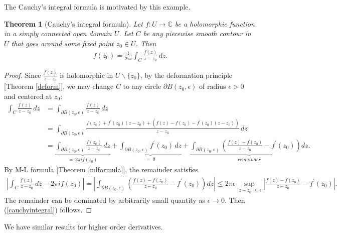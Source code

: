 \documentclass{article}
\numberwithin{equation}{section}
\newcommand{\bbC}{\mathbb{C}}
\theoremstyle{plain}
\newtheorem{theorem}{Theorem}[section]
\theoremstyle{definition}
\begin{document}
The Cauchy's integral formula is motivated by this example.
\begin{theorem}[Cauchy's integral formula]\label{cauchyintformula}
Let $f:U\to\bbC$ be a holomorphic function in a simply connected open domain $U$. Let $C$ be any piecewise smooth contour in $U$ that goes around some fixed point $z_0\in U$. Then
\begin{align}
	f(z_0)=\frac{1}{2\pi i}\int_C\frac{f(z)}{z-z_0}\,dz.\label{cauchyintegral}
\end{align}
\end{theorem}
\begin{proof}
Since $\frac{f(z)}{z-z_0}$ is holomorphic in $U\backslash\{z_0\}$, by the deformation principle [Theorem \ref{deform}], we may change $C$ to any circle $\partial B(z_0,\epsilon)$ of radius $\epsilon>0$ and centered at $z_0$:
\begin{align*}
	\int_C\frac{f(z)}{z-z_0}\,dz&=\int_{\partial B(z_0,\epsilon)}\frac{f(z)}{z-z_0}\,dz\\
	&=\int_{\partial B(z_0,\epsilon)}\frac{f(z_0)+f^\prime(z_0)(z-z_0)+\left(f(z)-f(z_0)-f^\prime(z_0)(z-z_0)\right)}{z-z_0}\,dz\\
	&=\underbrace{\int_{\partial B(z_0,\epsilon)}\frac{f(z_0)}{z-z_0}\,dz}_{=\,2\pi i f(z_0)}+\underbrace{\int_{\partial B(z_0,\epsilon)}f^\prime(z_0)\,dz}_{=\,0}+\underbrace{\int_{\partial B(z_0,\epsilon)}\left(\frac{f(z)-f(z_0)}{z-z_0}-f^\prime(z_0)\right)dz}_{remainder}.
\end{align*}
By M-L formula [Theorem \ref{mlformula}], the remainder satisfies
\begin{align*}
	\left\vert\int_C\frac{f(z)}{z-z_0}\,dz-2\pi i f(z_0)\right\vert=\left\vert\int_{\partial B(z_0,\epsilon)}\left(\frac{f(z)-f(z_0)}{z-z_0}-f^\prime(z_0)\right)dz\right\vert\leq2\pi\epsilon\sup_{\vert z-z_0\vert\leq\epsilon}\left\vert \frac{f(z)-f(z_0)}{z-z_0}-f^\prime(z_0)\right\vert.
\end{align*}
The remainder can be dominated by arbitrarily small quantity as $\epsilon\to 0$. Then (\ref{cauchyintegral}) follows.
\end{proof}

We have similar results for higher order derivatives.
\end{document}
